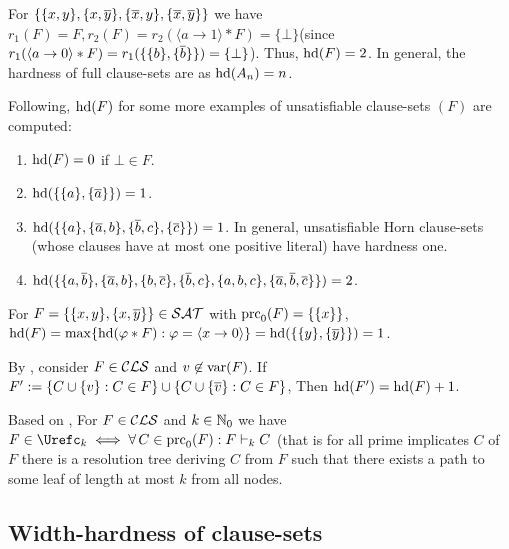 \documentclass{report}
\begin{document}
\begin{examp}\label{exp:harducls}
For $\{ \{ x,y \},\{ x,\overline{y} \},\{ \overline{x},y \},\{ \overline{x},\overline{y} \} \}$ we have $r_1(F)=F, r_2(F)=r_2( \langle a \rightarrow 1 \rangle * F) = \{ \bot \}$(since $r_1( \langle a \rightarrow 0 \rangle * F)=r_1 (\{\{ b \}, \{ \overline b \}\}) = \{ \bot \}$). Thus, $\operatorname{hd}(F) = 2$. In general, the hardness of full clause-sets are as $\operatorname{hd}(A_n)=n$.
  
Following, $\operatorname{hd}(F)$ for some more examples of unsatisfiable clause-sets $(F)$ are computed:
  \begin{enumerate}
  \item $\operatorname{hd}(F) = 0$ if $\bot \in F$.
  \item $\operatorname{hd}(\{ \{ a \},\{ \overline{a} \} \}) = 1$.
  \item $\operatorname{hd}(\{ \{ a \},\{ \overline{a},b \}, \{ \overline{b},c \}, \{ \overline{c} \} \}) = 1$. In general, unsatisfiable Horn clause-sets (whose clauses have at most one positive literal) have hardness one.
  \item $\operatorname{hd}(\{ \{ a,\overline{b} \},\{ \overline{a},b \},\{ b,\overline{c} \},\{ \overline{b},c \},\{ a,b,c \},\{ \overline{a},\overline{b},\overline{c} \} \}) = 2$.
  \end{enumerate}
\end{examp}

\begin{examp}\label{exp:hd-extd}
For $F = \{ \{ x, y \} , \{ x,\overline y \} \} \in \mathcal{SAT}$ with $\operatorname{prc}_0(F) = \{ \{ x \} \}$,  $\operatorname{hd}(F)= \max \{  \operatorname{hd}(\varphi * F) : \varphi =\langle x \rightarrow 0 \rangle  \}=\operatorname{hd}(\{ \{ y \},\{ \overline y \} \})=1$.
\end{examp}
\begin{lem}\label{lem:hd1}
By \cite{GwynneKullmann2012Slur}, consider $F \in \mathcal{CLS}$ and $v \not \in \operatorname{var}(F)$. If $F' := \{ C \cup \{ v \} : C \in F \} \cup \{ C \cup \{ \overline{v} \} : C \in F \}$, Then $\operatorname{hd}(F') = \operatorname{hd}(F) + 1$.
\end{lem}
\begin{lem}\label{lem:uck}
Based on \cite{GwynneKullmann2012Slur}, For $F \in \mathcal{CLS}$ and $k \in \mathbb{N}_0$ we have $F \in \Urefc_k \iff \fa\, C \in \primec_0(F) : F \vdash_k C$ (that is for all prime implicates $C$ of $F$ there is a resolution tree deriving $C$ from $F$ such that there exists a path to some leaf of length at most $k$ from all nodes.
\end{lem}
\subsection{Width-hardness of clause-sets}
\label{sec:whdd}
\end{document}
